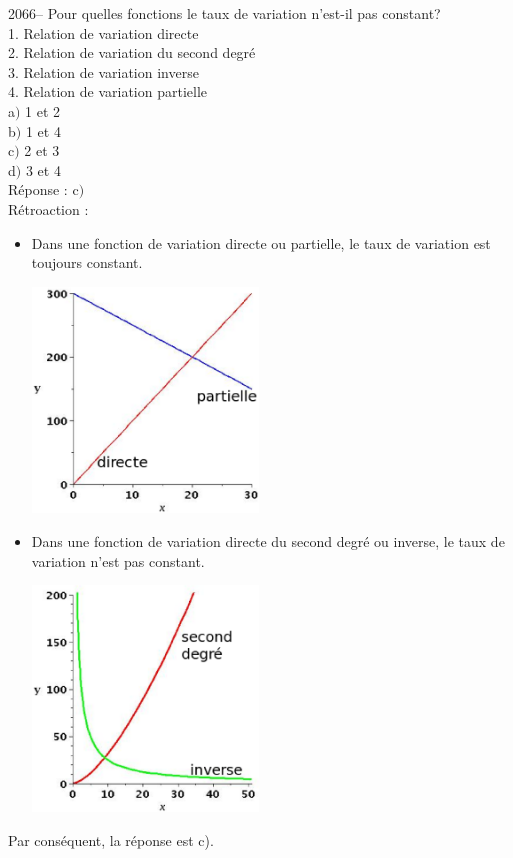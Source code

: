 \documentclass[letterpaper, 12pt]{article}
\begin{document}
2066-- Pour quelles fonctions le taux de variation n'est-il pas constant?\\

1. Relation de variation directe\\
2. Relation de variation du second degr\'e\\
3. Relation de variation inverse\\
4. Relation de variation partielle\\

a$)$ 1 et 2\\
b$)$ 1 et 4\\
c$)$ 2 et 3\\
d$)$ 3 et 4\\

R\'eponse : c$)$\\

R\'etroaction :\\
\begin{itemize}
 \item Dans une fonction de variation directe ou partielle, le taux de variation est toujours constant.\\
\begin{center}
 \includegraphics[width=6cm,bb=14 14 415 415]{Q2066a.eps}
\end{center}
 \item Dans une fonction de variation directe du second degr\'e ou inverse, le taux de variation n'est pas constant.\\
\begin{center}
 \includegraphics[width=6cm,bb=14 14 415 415]{Q2066b.eps}
\end{center}
\end{itemize}
Par cons\'equent, la r\'eponse est c).\\
\end{document}

